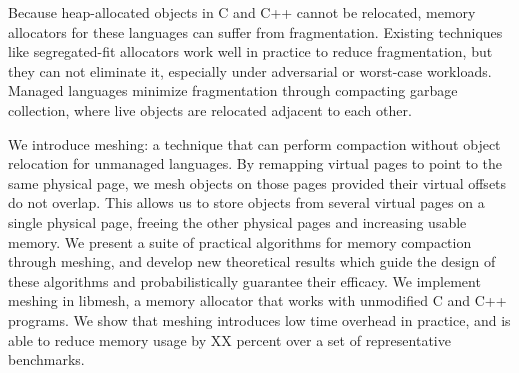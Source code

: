 Because heap-allocated objects in C and C++ cannot be relocated,
memory allocators for these languages can suffer from
fragmentation. Existing techniques like segregated-fit allocators work
well in practice to reduce fragmentation, but they can not eliminate
it, especially under adversarial or worst-case workloads. Managed
languages minimize fragmentation through compacting garbage
collection, where live objects are relocated adjacent to each other.

We introduce meshing: a technique that can perform compaction without
object relocation for unmanaged languages. By remapping virtual pages
to point to the same physical page, we mesh objects on those pages
provided their virtual offsets do not overlap. This allows us to store
objects from several virtual pages on a single physical page, freeing
the other physical pages and increasing usable memory.  We present a
suite of practical algorithms for memory compaction through meshing,
and develop new theoretical results which guide the design of these
algorithms and probabilistically guarantee their efficacy.  We
implement meshing in libmesh, a memory allocator that works with
unmodified C and C++ programs.  We show that meshing introduces low
time overhead in practice, and is able to reduce memory usage by XX
percent over a set of representative benchmarks.
